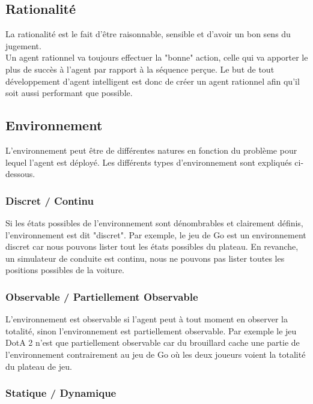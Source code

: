 \documentclass{article}
\begin{document}
\subsection{Rationalité}

La rationalité est le fait d'être raisonnable, sensible et d'avoir un bon sens du jugement.\\
Un agent rationnel va toujours effectuer la "bonne" action, celle qui va apporter le plus de succès à l'agent par rapport à la séquence perçue\cite{tutoptai}. Le but de tout développement d'agent intelligent est donc de créer un agent rationnel afin qu'il soit aussi performant que possible.

\subsection{Environnement}

L'environnement peut être de différentes natures en fonction du problème pour lequel l'agent est déployé. Les différents types d'environnement sont expliqués ci-dessous.

\subsubsection{Discret / Continu}

Si les états possibles de l'environnement sont dénombrables et clairement définis, l'environnement est dit "discret". Par exemple, le jeu de Go est un environnement discret car nous pouvons lister tout les états possibles du plateau. En revanche, un simulateur de conduite est continu, nous ne pouvons pas lister toutes les positions possibles de la voiture\cite{tutoptai}.

\subsubsection{Observable / Partiellement Observable}

L'environnement est observable si l'agent peut à tout moment en observer la totalité, sinon l'environnement est partiellement observable. Par exemple le jeu DotA 2 n'est que partiellement observable car du brouillard cache une partie de l'environnement contrairement au jeu de Go où les deux joueurs voient la totalité du plateau de jeu\cite{tutoptai}.

\subsubsection{Statique / Dynamique}
\end{document}
